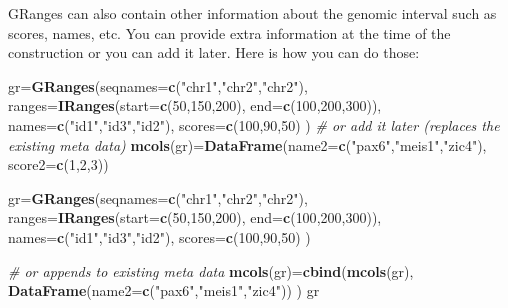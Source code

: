 \documentclass[12pt,]{krantz}
\newenvironment{Shaded}{\begin{snugshade}}{\end{snugshade}}
\newcommand{\CommentTok}[1]{\textcolor[rgb]{0.56,0.35,0.01}{\textit{#1}}}
\newcommand{\DataTypeTok}[1]{\textcolor[rgb]{0.13,0.29,0.53}{#1}}
\newcommand{\DecValTok}[1]{\textcolor[rgb]{0.00,0.00,0.81}{#1}}
\newcommand{\KeywordTok}[1]{\textcolor[rgb]{0.13,0.29,0.53}{\textbf{#1}}}
\newcommand{\NormalTok}[1]{#1}
\newcommand{\StringTok}[1]{\textcolor[rgb]{0.31,0.60,0.02}{#1}}
\begin{document}
GRanges can also contain other information about the genomic interval such as scores, names, etc. You can provide extra information at the time of the construction or you can add it later. Here is how you can do those:

\begin{Shaded}
\begin{Highlighting}[]
\NormalTok{gr=}\KeywordTok{GRanges}\NormalTok{(}\DataTypeTok{seqnames=}\KeywordTok{c}\NormalTok{(}\StringTok{"chr1"}\NormalTok{,}\StringTok{"chr2"}\NormalTok{,}\StringTok{"chr2"}\NormalTok{),}
           \DataTypeTok{ranges=}\KeywordTok{IRanges}\NormalTok{(}\DataTypeTok{start=}\KeywordTok{c}\NormalTok{(}\DecValTok{50}\NormalTok{,}\DecValTok{150}\NormalTok{,}\DecValTok{200}\NormalTok{),}
                          \DataTypeTok{end=}\KeywordTok{c}\NormalTok{(}\DecValTok{100}\NormalTok{,}\DecValTok{200}\NormalTok{,}\DecValTok{300}\NormalTok{)),}
           \DataTypeTok{names=}\KeywordTok{c}\NormalTok{(}\StringTok{"id1"}\NormalTok{,}\StringTok{"id3"}\NormalTok{,}\StringTok{"id2"}\NormalTok{),}
           \DataTypeTok{scores=}\KeywordTok{c}\NormalTok{(}\DecValTok{100}\NormalTok{,}\DecValTok{90}\NormalTok{,}\DecValTok{50}\NormalTok{)}
\NormalTok{)}
\CommentTok{# or add it later (replaces the existing meta data)}
\KeywordTok{mcols}\NormalTok{(gr)=}\KeywordTok{DataFrame}\NormalTok{(}\DataTypeTok{name2=}\KeywordTok{c}\NormalTok{(}\StringTok{"pax6"}\NormalTok{,}\StringTok{"meis1"}\NormalTok{,}\StringTok{"zic4"}\NormalTok{),}
                    \DataTypeTok{score2=}\KeywordTok{c}\NormalTok{(}\DecValTok{1}\NormalTok{,}\DecValTok{2}\NormalTok{,}\DecValTok{3}\NormalTok{))}

\NormalTok{gr=}\KeywordTok{GRanges}\NormalTok{(}\DataTypeTok{seqnames=}\KeywordTok{c}\NormalTok{(}\StringTok{"chr1"}\NormalTok{,}\StringTok{"chr2"}\NormalTok{,}\StringTok{"chr2"}\NormalTok{),}
           \DataTypeTok{ranges=}\KeywordTok{IRanges}\NormalTok{(}\DataTypeTok{start=}\KeywordTok{c}\NormalTok{(}\DecValTok{50}\NormalTok{,}\DecValTok{150}\NormalTok{,}\DecValTok{200}\NormalTok{),}
                          \DataTypeTok{end=}\KeywordTok{c}\NormalTok{(}\DecValTok{100}\NormalTok{,}\DecValTok{200}\NormalTok{,}\DecValTok{300}\NormalTok{)),}
           \DataTypeTok{names=}\KeywordTok{c}\NormalTok{(}\StringTok{"id1"}\NormalTok{,}\StringTok{"id3"}\NormalTok{,}\StringTok{"id2"}\NormalTok{),}
           \DataTypeTok{scores=}\KeywordTok{c}\NormalTok{(}\DecValTok{100}\NormalTok{,}\DecValTok{90}\NormalTok{,}\DecValTok{50}\NormalTok{)}
\NormalTok{)}

\CommentTok{# or appends to existing meta data}
\KeywordTok{mcols}\NormalTok{(gr)=}\KeywordTok{cbind}\NormalTok{(}\KeywordTok{mcols}\NormalTok{(gr),}
                          \KeywordTok{DataFrame}\NormalTok{(}\DataTypeTok{name2=}\KeywordTok{c}\NormalTok{(}\StringTok{"pax6"}\NormalTok{,}\StringTok{"meis1"}\NormalTok{,}\StringTok{"zic4"}\NormalTok{)) )}
\NormalTok{gr}
\end{Highlighting}
\end{Shaded}
\end{document}

